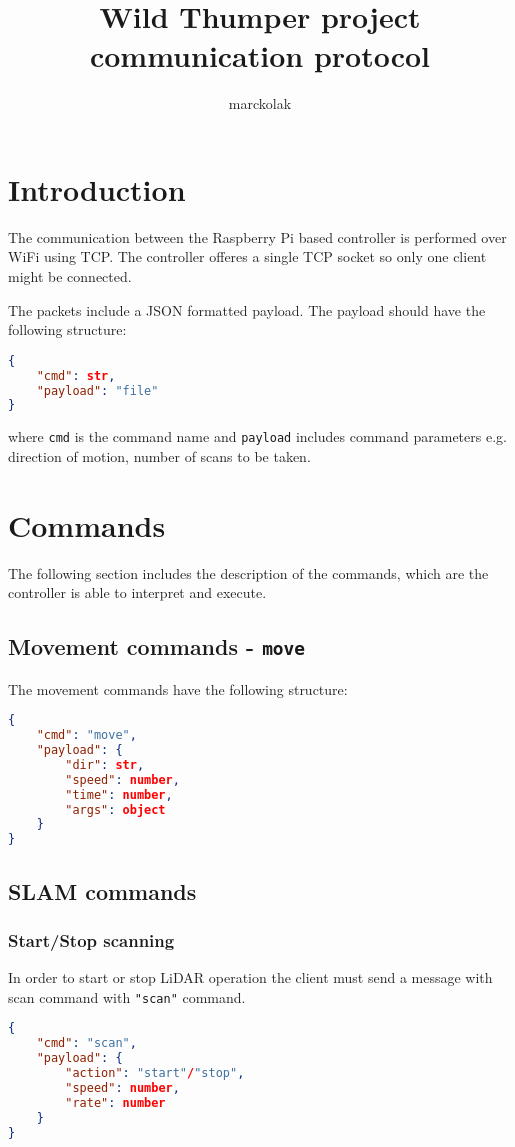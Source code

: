 \documentclass[11pt,a4paper]{article}
\author{marckolak}
\title{Wild Thumper project communication protocol}
\begin{document}
\maketitle

\section{Introduction}
The communication between the Raspberry Pi based controller is performed over WiFi using TCP. The controller offeres a single TCP socket so only one client might be connected.

The packets include a JSON formatted payload. The payload should have the following structure:
\vspace{6pt}
\begin{lstlisting}[language=json,firstnumber=1]
{
	"cmd": str,
  	"payload": "file"
}
\end{lstlisting}
where \texttt{cmd} is the command name and \texttt{payload} includes command parameters e.g. direction of motion, number of scans to be taken.

\section{Commands}
The following section includes the description of the commands, which are the controller is able to interpret and execute.

\subsection{Movement commands - \texttt{move}}
The movement commands have the following structure:
\vspace{6pt}
\begin{lstlisting}[language=json,firstnumber=1]
{
	"cmd": "move",
  	"payload": {
		"dir": str,
		"speed": number,
		"time": number,
		"args": object
  	}
}
\end{lstlisting}


\subsection{SLAM commands}
\subsubsection{Start/Stop scanning}
In order to start or stop LiDAR operation the client must send a message with scan command with \texttt{"scan"} command.
\vspace{6pt}
\begin{lstlisting}[language=json,firstnumber=1]
{
	"cmd": "scan",
  	"payload": {
		"action": "start"/"stop",
		"speed": number,
		"rate": number
  	}
}
\end{lstlisting}
\end{document}
